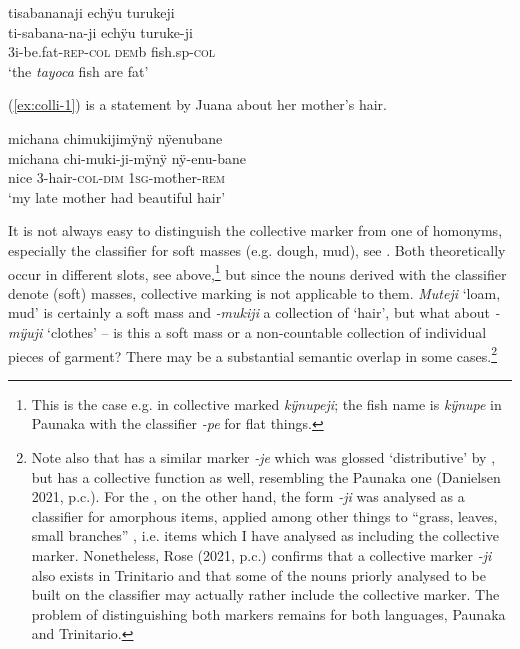 \ea\label{ex:turukeji}
\begingl 
\glpreamble tisabananaji echÿu turukeji\\
\gla ti-sabana-na-ji echÿu turuke-ji\\ 
\glb 3i-be.fat-\textsc{rep}-\textsc{col} \textsc{dem}b fish.sp-\textsc{col}\\ 
\glft ‘the \textit{tayoca} fish are fat’\\ 
\endgl
\trailingcitation{[cux-c120414ls-2.152]}
\xe

(\ref{ex:colli-1}) is a statement by Juana about her mother’s hair.

\ea\label{ex:colli-1}
\begingl
\glpreamble michana chimukijimÿnÿ nÿenubane\\
\gla michana chi-muki-ji-mÿnÿ nÿ-enu-bane\\
\glb nice 3-hair-\textsc{col}-\textsc{dim} 1\textsc{sg}-mother-\textsc{rem}\\
\glft ‘my late mother had beautiful hair’
\endgl
\trailingcitation{[jxx-d181102l.47]}
\xe


It is not always easy to distinguish the collective marker from one of homo\-nyms, especially the classifier for soft masses (e.g. dough, mud), see . Both theoretically occur in different slots, see  above,\footnote{This is the case e.g. in collective marked \textit{kÿnupeji}; the fish name is \textit{kÿnupe} in Paunaka %
 with the classifier \textit{-pe} for flat things.} but since the nouns derived with the classifier denote (soft) masses, collective marking is not applicable to them. \textit{Muteji} ‘loam, mud’ is certainly a soft mass and \textit{-mukiji} a collection of ‘hair’, but what about \textit{-mÿuji} ‘clothes’ – is this a soft mass or a non-countable collection of individual pieces of garment? There may be a substantial semantic overlap in some cases.\footnote{Note also that  has a similar marker \textit{-je} which was glossed ‘distributive’ by \citet[155--156]{Danielsen2007}, but has a collective function as well, resembling the Paunaka one (Danielsen 2021, p.c.). For the , on the other hand, the form \textit{-ji} was analysed as a classifier for amorphous items, applied among other things to “grass, leaves, small branches” \citep[17]{Rose2020}, i.e. items which I have analysed as including the collective marker. Nonetheless, Rose (2021, p.c.) confirms that a collective marker \textit{-ji} also exists in Trinitario and that some of the nouns priorly analysed to be built on the classifier may actually rather include the collective marker. The problem of distinguishing both markers remains for both languages, Paunaka and Trinitario.}

